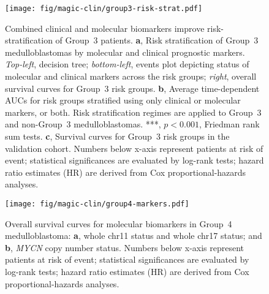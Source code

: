 \documentclass[11pt,letterpaper]{article}
\theoremstyle{definition}
\begin{document}
\begin{figure}[h]
	\begin{center}
		\texttt{[image: fig/magic-clin/group3-risk-strat.pdf]}
	\end{center}
	\caption[Combined clinical and molecular biomarkers improve risk-stratification of Group~3 patients.]
	{
	Combined clinical and molecular biomarkers improve risk-stratification of Group~3 patients.
	\textbf{a}, Risk stratification of Group~3 medulloblastomas by molecular and clinical prognostic markers.	\emph{Top-left}, decision tree; \emph{bottom-left}, events plot depicting status of molecular and clinical markers across the risk groups; \emph{right}, overall survival curves for Group~3 risk groups.
	\textbf{b}, Average time-dependent AUCs for risk groups stratified using only clinical or molecular markers, or both. Risk stratification regimes are applied to Group~3 and non-Group~3 medulloblastomas. ***, $p < 0.001$, Friedman rank sum tests.
	\textbf{c}, Survival curves for Group~3 risk groups in the validation cohort.
	Numbers below x-axis represent patients at risk of event; statistical significances are evaluated by log-rank tests; hazard ratio estimates (HR) are derived from Cox proportional-hazards analyses.
	}
	\label{fig:group3-risk-strat}
\end{figure}

\begin{figure}[h]
	\begin{center}
		\texttt{[image: fig/magic-clin/group4-markers.pdf]}
	\end{center}
	\caption[Overall survival curves for molecular biomarkers in Group~4 medulloblastoma]
	{
	Overall survival curves for molecular biomarkers in Group~4 medulloblastoma:
	\textbf{a}, whole chr11 status and whole chr17 status; and
	\textbf{b}, \emph{MYCN} copy number status.
	Numbers below x-axis represent patients at risk of event; statistical significances are evaluated by log-rank tests; hazard ratio estimates (HR) are derived from Cox proportional-hazards analyses.
	}
	\label{fig:group4-markers}
\end{figure}
\end{document}
